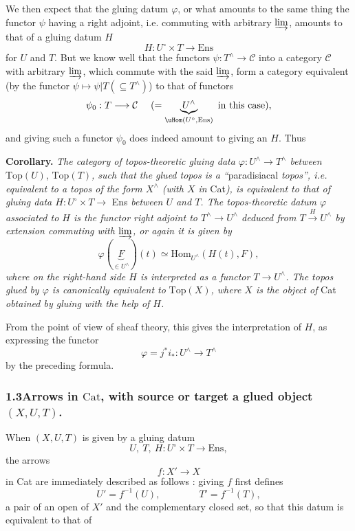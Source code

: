 We then expect that the gluing datum $\varphi$, or what amounts to the same thing the functor $\psi$ having a right adjoint, i.e. commuting with arbitrary $\varinjlim$, amounts to that of a gluing datum $H$
\[
H : U^\circ \times T \longrightarrow \mathrm{Ens}
\]
for $U$ and $T$. But we know well that the functors $\psi : T^\wedge \longrightarrow \mathcal{C}$ into a category $\mathcal{C}$ with arbitrary $\varinjlim$, which commute with the said $\varinjlim$, form a category equivalent (by the functor $\psi \longmapsto \psi|T(\subseteq T^\wedge)$) to that of functors
\[
\psi_0 : T \longrightarrow \mathcal{C} \quad\ (= \underbrace{U^\wedge}_{\uHom(U^\circ,\mathrm{Ens})} \text{ in this case}),
\]
and giving such a functor $\psi_0$ does indeed amount to giving an $H$. Thus

\textbf{Corollary.} \textit{The category of topos-theoretic gluing data $\varphi : U^\wedge \longrightarrow T^\wedge$ between} $\mathrm{Top}(U)$, $\mathrm{Top}(T)$\textit{, such that the glued topos is a ``}paradisiacal\textit{ topos'', i.e. equivalent to a topos of the form $X^\wedge$ (with $X$ in} Cat\textit{), is equivalent to that of gluing data $H : U^\circ \times T \longrightarrow$} Ens \textit{between $U$ and $T$. The topos-theoretic datum $\varphi$ associated to $H$ is the functor right adjoint to $T^\wedge \longrightarrow U^\wedge$ deduced from $T \xrightarrow{H} U^\wedge$ by extension commuting with $\varinjlim$, or again it is given by}
\[
\varphi(\underbrace{F}_{\in U^\wedge})(t) \simeq \mathrm{Hom}_{U^\wedge}(H(t),F),
\]
\textit{where on the right-hand side $H$ is interpreted as a functor $T \longrightarrow U^\wedge$. The topos glued by $\varphi$ is canonically equivalent to} $\mathrm{Top}(X)$\textit{, where $X$ is the object of} Cat \textit{obtained by gluing with the help of $H$.}

From the point of view of sheaf theory, this gives the interpretation of $H$, as expressing the functor
\[
\varphi = j^*i_* : U^\wedge \longrightarrow T^\wedge
\]
by the preceding formula.



\subsubsection*{1.3\quad Arrows in $\mathrm{Cat}$, with source or target a glued object $(X,U,T)$.}

When $(X,U,T)$ is given by a gluing datum
\[
U,\ T,\ H : U^\circ \times T \longrightarrow \mathrm{Ens},
\]
the arrows
\[
f : X' \longrightarrow X
\]
in Cat are immediately described as follows : giving $f$ first defines
\[
U' = f^{-1}(U), \qquad\qquad T' = f^{-1}(T),
\]
a pair of an open of $X'$ and the complementary closed set, so that this datum is equivalent to that of

